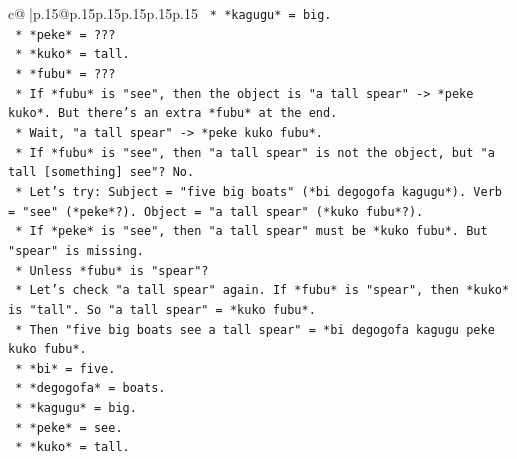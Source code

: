 \documentclass{article}
\begin{document}
{\begin{supertabular}{c@{$\;$}|p{.15\linewidth}@{}p{.15\linewidth}p{.15\linewidth}p{.15\linewidth}p{.15\linewidth}p{.15\linewidth}}
{{{\texttt{                                                *   *kagugu* = big.} \\
\texttt{                                                *   *peke* = ???} \\
\texttt{                                                *   *kuko* = tall.} \\
\texttt{                                                *   *fubu* = ???} \\
\texttt{                                                *   If *fubu* is "see", then the object is "a tall spear" {-}> *peke kuko*. But there's an extra *fubu* at the end.} \\
\texttt{                                                *   Wait, "a tall spear" {-}> *peke kuko fubu*.} \\
\texttt{                                                *   If *fubu* is "see", then "a tall spear" is not the object, but "a tall {[}something{]} see"? No.} \\
\texttt{                                                *   Let's try: Subject = "five big boats" (*bi degogofa kagugu*). Verb = "see" (*peke*?). Object = "a tall spear" (*kuko fubu*?).} \\
\texttt{                                                *   If *peke* is "see", then "a tall spear" must be *kuko fubu*. But "spear" is missing.} \\
\texttt{                                                *   Unless *fubu* is "spear"?} \\
\texttt{                                                *   Let's check "a tall spear" again. If *fubu* is "spear", then *kuko* is "tall". So "a tall spear" = *kuko fubu*.} \\
\texttt{                                                *   Then "five big boats see a tall spear" = *bi degogofa kagugu peke kuko fubu*.} \\
\texttt{                                                    *   *bi* = five.} \\
\texttt{                                                    *   *degogofa* = boats.} \\
\texttt{                                                    *   *kagugu* = big.} \\
\texttt{                                                    *   *peke* = see.} \\
\texttt{                                                    *   *kuko* = tall.} \\
}}}
\end{supertabular}}
\end{document}
